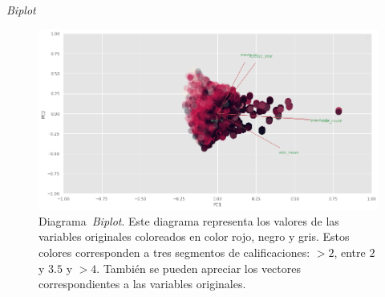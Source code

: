 \documentclass[11pt,a4paper,twoside]{thesis}
\begin{document}
\clearpage

\begin{description}
	\item[\textit{Biplot}]
\end{description}

\begin{figure}[h!]
	\centering
	\includegraphics[width=15cm]{./images/PCA-biplot.png}
	\caption{
		Diagrama~\cite{biplot}\textit{Biplot}. Este diagrama representa
		los valores de las variables originales coloreados en color rojo,
		negro y gris. Estos colores corresponden a tres segmentos de
		calificaciones: $>2$, entre $2$ y $3.5$ y $>4$.
		También se pueden apreciar los vectores correspondientes a
		las variables originales.
	}
	\label{fig:biplot}
\end{figure}
\end{document}
